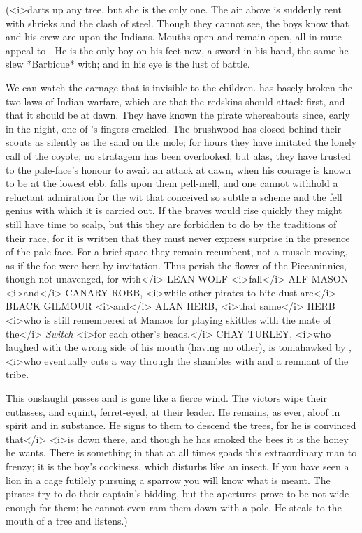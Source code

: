 \begin{stagedir}
(\tink <i>darts up any tree, but she is the only one.
The air above is suddenly rent with shrieks and the clash of steel.
Though they cannot see, the boys know that \hook and his crew are upon the Indians.
Mouths open and remain open, all in mute appeal to \peter.
He is the only boy on his feet now, a sword in his hand, the same he slew *Barbicue* with;
and in his eye is the lust of battle.

We can watch the carnage that is invisible to the children.
\hook has basely broken the two laws of Indian warfare,
which are that the redskins should attack first, and that it should be at dawn.
They have known the pirate whereabouts since, early in the night, one of \smee's fingers crackled.
The brushwood has closed behind their scouts as silently as the sand on the mole;
for hours they have imitated the lonely call of the coyote;
no stratagem has been overlooked, but alas, they have trusted to the pale-face's honour to await an attack at dawn,
when his courage is known to be at the lowest ebb.
\hook falls upon them pell-mell,
and one cannot withhold a reluctant admiration for the wit that conceived so subtle a scheme
and the fell genius with which it is carried out.
If the braves would rise quickly they might still have time to scalp,
but this they are forbidden to do by the traditions of their race,
for it is written that they must never express surprise in the presence of the pale-face.
For a brief space they remain recumbent, not a muscle moving, as if the foe were here by invitation.
Thus perish the flower of the Piccaninnies, though not unavenged,
for with</i> {\namefont LEAN WOLF} <i>fall</i> {\namefont ALF MASON} <i>and</i> {\namefont CANARY ROBB},
<i>while other pirates to bite dust are</i> {\namefont BLACK GILMOUR} <i>and</i> {\namefont ALAN HERB},
<i>that same</i> {\namefont HERB} <i>who is still remembered at Manaos
for playing skittles with the mate of the</i> \emph{Switch} <i>for each other's heads.</i>
{\namefont CHAY TURLEY}, <i>who laughed with the wrong side of his mouth (having no other),
is tomahawked by \panther,
<i>who eventually cuts a way through the shambles with \tigerlily and a remnant of the tribe.

This onslaught passes and is gone like a fierce wind.
The victors wipe their cutlasses, and squint, ferret-eyed, at their leader.
He remains, as ever, aloof in spirit and in substance.
He signs to them to descend the trees, for he is convinced that</i> \pan <i>is down there,
and though he has smoked the bees it is the honey he wants.
There is something in \peter that at all times goads this extraordinary man to frenzy;
it is the boy's cockiness, which disturbs \hook like an insect.
If you have seen a lion in a cage futilely pursuing a sparrow you will know what is meant.
The pirates try to do their captain's bidding, but the apertures prove to be not wide enough for them;
he cannot even ram them down with a pole.
He steals to the mouth of a tree and listens.)
\end{stagedir}

